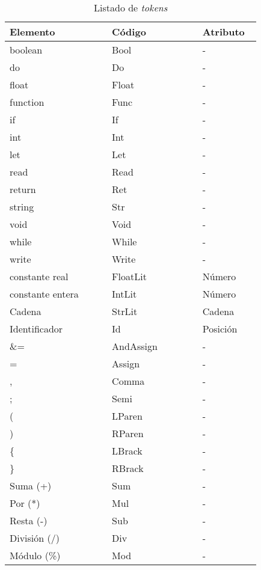 \documentclass[a4paper]{CSMakotoTechnicalReport}
\begin{document}
\begin{multicols}{2}
    \renewcommand{\arraystretch}{1.2}
    \begin{table}[H]
        \caption{Listado de \textit{tokens}}
        \begin{tabular}{L{0.35\linewidth} L{0.31\linewidth} L{0.17\linewidth}}
            \toprule
            \textbf{Elemento} & \textbf{Código} & \textbf{Atributo} \\
            \midrule
            boolean & Bool & - \\
            do & Do & - \\
            float & Float & - \\
            function & Func & - \\
            if & If & - \\
            int & Int & - \\
            let & Let & - \\
            read & Read & - \\
            return & Ret & - \\
            string & Str & - \\
            void & Void & - \\
            while & While & - \\
            write & Write & - \\
            constante real & FloatLit & Número \\
            constante entera & IntLit & Número \\
            Cadena & StrLit & Cadena \\
            Identificador & Id & Posición \\
            \&= & AndAssign & - \\
            = & Assign & - \\
            , & Comma & - \\
            ; & Semi & - \\
            ( & LParen & - \\
            ) & RParen & - \\
            \{ & LBrack & - \\
            \} & RBrack & - \\
            Suma (+) & Sum & - \\
            Por (*) & Mul & - \\
            Resta (-) & Sub & - \\
            División (/) & Div & - \\
            Módulo (\%) & Mod & - \\

\end{tabular}
\end{table}
\end{multicols}
\end{document}
